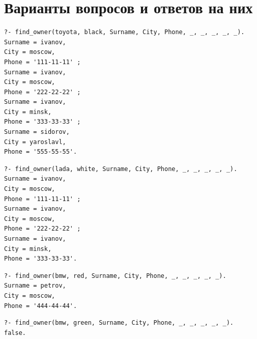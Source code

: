 \section{Варианты вопросов и ответов на них}

\begin{lstlisting}[caption={Вопрос и ответ №1}, label={lst:q1}]
?- find_owner(toyota, black, Surname, City, Phone, _, _, _, _, _).
Surname = ivanov,
City = moscow,
Phone = '111-11-11' ;
Surname = ivanov,
City = moscow,
Phone = '222-22-22' ;
Surname = ivanov,
City = minsk,
Phone = '333-33-33' ;
Surname = sidorov,
City = yaroslavl,
Phone = '555-55-55'.
\end{lstlisting}

\begin{lstlisting}[caption={Вопрос и ответ №2}, label={lst:q2}]
?- find_owner(lada, white, Surname, City, Phone, _, _, _, _, _).
Surname = ivanov,
City = moscow,
Phone = '111-11-11' ;
Surname = ivanov,
City = moscow,
Phone = '222-22-22' ;
Surname = ivanov,
City = minsk,
Phone = '333-33-33'.
\end{lstlisting}

\begin{lstlisting}[caption={Вопрос и ответ №3}, label={lst:q3}]
?- find_owner(bmw, red, Surname, City, Phone, _, _, _, _, _).
Surname = petrov,
City = moscow,
Phone = '444-44-44'.
\end{lstlisting}

\begin{lstlisting}[caption={Вопрос и ответ №4}, label={lst:q4}]
?- find_owner(bmw, green, Surname, City, Phone, _, _, _, _, _).
false.
\end{lstlisting}
